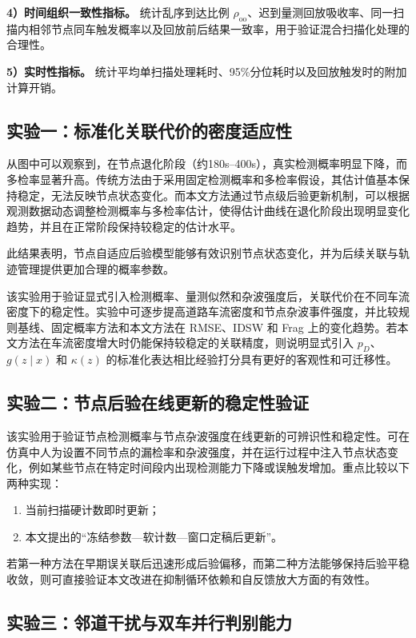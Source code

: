 \documentclass{xdupgthesis}
\begin{document}
\textbf{4）时间组织一致性指标。} 统计乱序到达比例 $\rho_{\mathrm{oo}}$、迟到量测回放吸收率、同一扫描内相邻节点同车触发概率以及回放前后结果一致率，用于验证混合扫描化处理的合理性。

\textbf{5）实时性指标。} 统计平均单扫描处理耗时、95\%分位耗时以及回放触发时的附加计算开销。

\subsection{实验一：标准化关联代价的密度适应性}

从图中可以观察到，在节点退化阶段（约180s–400s），真实检测概率明显下降，而多检率显著升高。传统方法由于采用固定检测概率和多检率假设，其估计值基本保持稳定，无法反映节点状态变化。而本文方法通过节点级后验更新机制，可以根据观测数据动态调整检测概率与多检率估计，使得估计曲线在退化阶段出现明显变化趋势，并且在正常阶段保持较稳定的估计水平。

此结果表明，节点自适应后验模型能够有效识别节点状态变化，并为后续关联与轨迹管理提供更加合理的概率参数。

该实验用于验证显式引入检测概率、量测似然和杂波强度后，关联代价在不同车流密度下的稳定性。实验中可逐步提高道路车流密度和节点杂波事件强度，并比较规则基线、固定概率方法和本文方法在 RMSE、IDSW 和 Frag 上的变化趋势。若本文方法在车流密度增大时仍能保持较稳定的关联精度，则说明显式引入 $p_D$、$g(z\mid x)$ 和 $\kappa(z)$ 的标准化表达相比经验打分具有更好的客观性和可迁移性。

\subsection{实验二：节点后验在线更新的稳定性验证}

该实验用于验证节点检测概率与节点杂波强度在线更新的可辨识性和稳定性。可在仿真中人为设置不同节点的漏检率和杂波强度，并在运行过程中注入节点状态变化，例如某些节点在特定时间段内出现检测能力下降或误触发增加。重点比较以下两种实现：
\begin{enumerate}
	\item 当前扫描硬计数即时更新；
	\item 本文提出的“冻结参数—软计数—窗口定稿后更新”。
\end{enumerate}
若第一种方法在早期误关联后迅速形成后验偏移，而第二种方法能够保持后验平稳收敛，则可直接验证本文改进在抑制循环依赖和自反馈放大方面的有效性。

\subsection{实验三：邻道干扰与双车并行判别能力}
\end{document}
